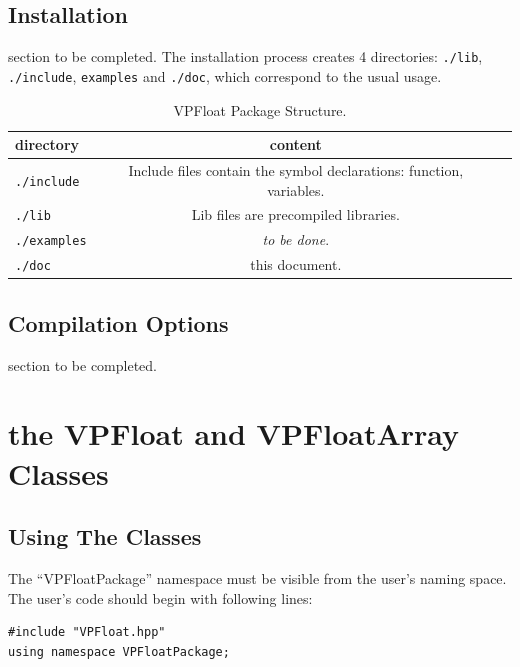 \documentclass[11pt]{report}
\begin{document}
\section{Installation}\label{installation}

section to be completed.
The installation process creates 4 directories: \texttt{./lib}, \texttt{./include}, \texttt{examples}  and \texttt{./doc},  which correspond to the usual usage.
\begin{table}[h!]
  \begin{center}
    \caption{VPFloat Package Structure.}
    \label{tab:table1}
    \begin{tabular}{l|c|r} %
      \textbf{directory} & \textbf{content} \\
      \hline
      \texttt{./include} &  Include files contain the symbol declarations: function, variables.  \\
      \hline
      \texttt{./lib} & Lib files are precompiled libraries.  \\
      \hline
      \texttt{./examples} & \emph{to be done}.  \\
      \hline
      \texttt{./doc} & this document.  \\
      \hline
    \end{tabular}
  \end{center}
\end{table}
\section{Compilation Options}
section to be completed.

\chapter{the VPFloat and VPFloatArray Classes}

\section{Using The Classes}
 The ``VPFloatPackage'' namespace must be visible from the user's naming space. The user's code should begin with following lines:
\begin{verbatim}
#include "VPFloat.hpp"
using namespace VPFloatPackage;
\end{verbatim}
\end{document}
